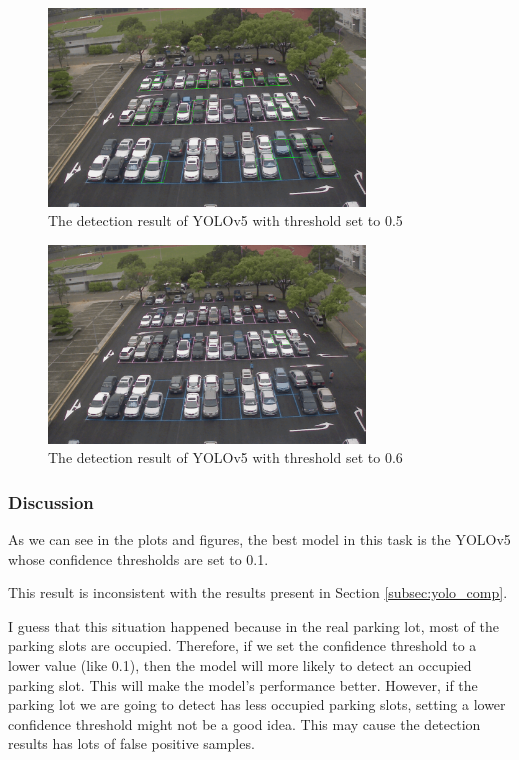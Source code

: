 \documentclass{article}[12pt]
\begin{document}
\begin{figure}[H]
    \centering
    \includegraphics[width=0.75\textwidth]{figure/Yolov5_first_frame_5.png}
    \caption{The detection result of YOLOv5 with threshold set to 0.5}
\end{figure}

\begin{figure}[H]
    \centering
    \includegraphics[width=0.75\textwidth]{figure/Yolov5_first_frame_6.png}
    \caption{The detection result of YOLOv5 with threshold set to 0.6}
\end{figure}

\subsubsection{Discussion}

As we can see in the plots and figures, the best model in this task is
the YOLOv5 whose confidence thresholds are set to 0.1.

This result is inconsistent with the results present in Section \ref{subsec:yolo_comp}. 

I guess that this situation happened because in the real parking lot, 
most of the parking slots are occupied. 
Therefore, if we set the confidence threshold to a lower value (like 0.1), then the model 
will more likely to detect an occupied parking slot. This will make the model's performance better.
However, if the parking lot we are going to detect has less occupied parking slots,
setting a lower confidence threshold might not be a good idea. This may cause the detection results 
has lots of false positive samples.
\end{document}
